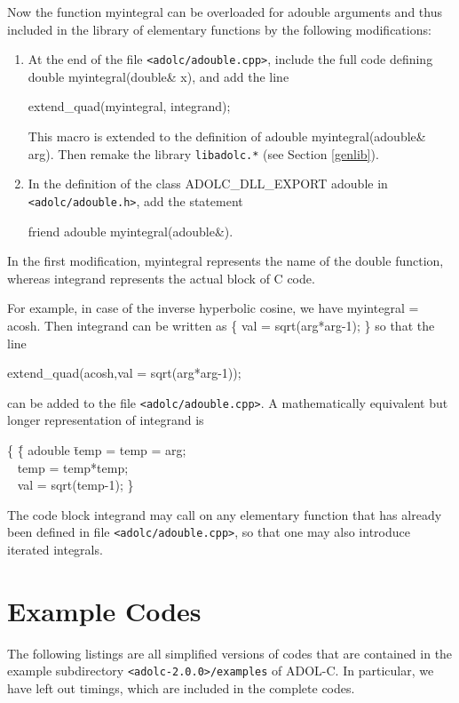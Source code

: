 \documentclass[11pt,twoside]{article}
\begin{document}
Now the function {\sf myintegral} can be overloaded for {\sf adouble}
arguments and thus included in the library of elementary functions 
by the following modifications:
\begin{enumerate}
\item
At the end of the file \verb=<adolc/adouble.cpp>=, include the full code
defining \\ {\sf double myintegral(double\& x)}, and add the line
\begin{center}
{\sf extend\_quad(myintegral, integrand); }
\end{center}
This macro is extended to the definition of 
 {\sf adouble myintegral(adouble\& arg)}.
Then remake the library \verb=libadolc.*= (see Section \ref{genlib}). 
\item
In the definition of the class
{\sf ADOLC\_DLL\_EXPORT adouble} in \verb=<adolc/adouble.h>=, add the statement
\begin{center}
{\sf friend adouble myintegral(adouble\&)}.
\end{center}
\end{enumerate}
In the first modification, {\sf myintegral} represents the name of the
{\sf double} function, whereas {\sf integrand} represents the actual block
of C code. 

For example, in case of the inverse hyperbolic cosine, we have 
{\sf myintegral} = {\sf acosh}. Then {\sf integrand} can be written as 
{\sf \{ val = sqrt(arg*arg-1); \}} 
so that the line
\begin{center}
{\sf extend\_quad(acosh,val = sqrt(arg*arg-1));} 
\end{center}
can be added to the file \verb=<adolc/adouble.cpp>=.
A mathematically equivalent but longer representation of 
{\sf integrand} is
\begin{center}
\begin{tabbing}
{\sf \{ }\hspace{1.0in}\= {\sf  \{ adouble} \= temp =   \kill
  \> {\sf temp = arg;} \\
 \> \ \> {\sf  temp = temp*temp; } \\ 
 \> \ \> {\sf  val = sqrt(temp-1); \}}  
\end{tabbing}
\end{center} 
The code block {\sf integrand} may call on any elementary function that has already
been defined in file \verb=<adolc/adouble.cpp>=, so that one may also introduce
iterated integrals.
%
%
\section{Example Codes}
\label{example}
%
The following listings are all simplified versions of codes that
are contained in the example subdirectory 
\verb=<adolc-2.0.0>/examples= of ADOL-C. In particular,
we have left out timings, which are included in the complete codes.
%
\end{document}
